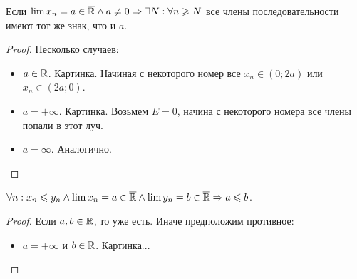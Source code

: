 \begin{theorem}
    Если $\lim x_n = a \in \overline{\mathbb{R}} \land a \neq 0 \Rightarrow \exists N: \forall n \geqslant N$ все члены последовательности имеют тот же знак, что и $a$.
\end{theorem}
\begin{proof}
    Несколько случаев:
     \begin{itemize}
         \item $a \in \mathbb{R}$. Картинка. Начиная с некоторого номер все  $x_n \in (0; 2a)$ или  $x_n \in (2a; 0)$.
         \item  $a = +\infty$. Картинка. Возьмем  $E=0$, начина с некоторого номера все члены попали в этот луч.
         \item  $a = \infty$. Аналогично.
    \end{itemize}
\end{proof}
\begin{theorem}
    $\forall n: x_n \leqslant y_n \land \lim x_n = a \in \overline{\mathbb{R}} \land \lim y_n = b \in \overline{\mathbb{R}} \Rightarrow a \leqslant b$.
\end{theorem}
\begin{proof}
    Если $a, b \in \mathbb{R}$, то уже есть. Иначе предположим противное:
     \begin{itemize}
         \item $a = +\infty$ и  $b \in \mathbb{R}$. Картинка...
    \end{itemize}
\end{proof}
